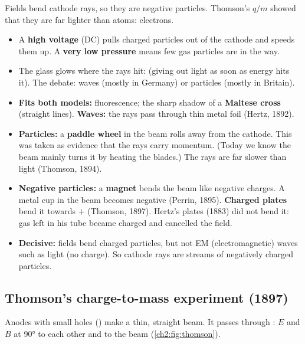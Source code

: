 \begin{bigidea}
Fields bend cathode rays, so they are negative particles. Thomson's $q/m$ showed that they
are far lighter than atoms: electrons.
\end{bigidea}

\begin{keywords}
\end{keywords}

\begin{itemize}
  \item A \textbf{high voltage} (DC) pulls charged particles out of the cathode and speeds them up.
        A \textbf{very low pressure} means few gas particles are in the way.
  \item The glass glows where the rays hit:  (giving out light as soon as energy
        hits it). The debate: waves (mostly in Germany) or particles (mostly in Britain).
  \item \textbf{Fits both models:} fluorescence; the sharp shadow of a \textbf{Maltese cross}
        (straight lines). \textbf{Waves:} the rays pass through thin metal foil (Hertz, 1892).
  \item \textbf{Particles:} a \textbf{paddle wheel} in the beam rolls away from the cathode.
        This was taken as evidence that the rays carry momentum. (Today we know the beam
        mainly turns it by heating the blades.) The rays are far slower than light (Thomson, 1894).
  \item \textbf{Negative particles:} a \textbf{magnet} bends the beam like negative charges. A
        metal cup in the beam becomes negative (Perrin, 1895). \textbf{Charged plates} bend it
        towards $+$ (Thomson, 1897). Hertz's plates (1883) did not bend it: gas left in his tube
        became charged and cancelled the field.
  \item \textbf{Decisive:} fields bend charged particles, but not EM (electromagnetic) waves such
        as light (no charge). So cathode rays are streams of negatively charged particles.
\end{itemize}

\subsection*{Thomson's charge-to-mass experiment (1897)}
Anodes with small holes () make a thin, straight beam. It passes through
: $E$ and $B$ at \ang{90} to each other and to the beam (\cref{ch2:fig:thomson}).

